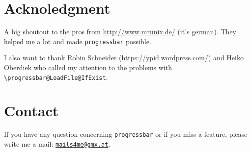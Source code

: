 \documentclass{ltxdoc}
\begin{document}
\section{Acknoledgment}
A big shoutout to the pros from \url{http://www.mrunix.de/} (it's german). They helped me a lot and made \texttt{progressbar} possible.

I also want to thank Robin Schneider (\url{https://ypid.wordpress.com/}) and Heiko Oberdiek who called my attention to the problems with\\ \lstinline+\progressbar@LoadFile@IfExist+.

\section{Contact}
If you have any question concerning \texttt{progressbar} or if you miss a feature, please write me a mail: \href{mailto:mails4me@gmx.at}{\texttt{mails4me@gmx.at}}.
\end{document}
